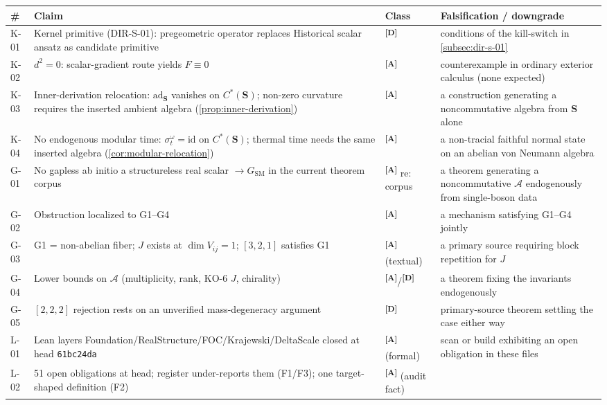 \documentclass[12pt,a4paper,twoside]{article}
\theoremstyle{plain}
\theoremstyle{definition}
\theoremstyle{remark}
\newcommand{\catmark}[1]{\textsuperscript{\textsf{\textbf{[#1]}}}}
\begin{document}
\begin{table}[htbp]
\centering\footnotesize
\begin{tabular}{@{}lp{5.3cm}lp{4.3cm}@{}}
\toprule
\# & Claim & Class & Falsification / downgrade \\
\midrule
K-01 & Kernel primitive (DIR-S-01): pregeometric operator replaces
Historical scalar ansatz as candidate primitive & \catmark{D} & conditions of the
kill-switch in \cref{subsec:dir-s-01} \\
K-02 & $d^2=0$: scalar-gradient route yields $F \equiv 0$ &
\catmark{A} & counterexample in ordinary exterior calculus (none
expected) \\
K-03 & Inner-derivation relocation: $\mathrm{ad}_{\mathbf S}$ vanishes on
$C^{\ast}(\mathbf S)$; non-zero curvature requires the inserted ambient
algebra (\cref{prop:inner-derivation}) & \catmark{A} & a construction
generating a noncommutative algebra from $\mathbf S$ alone \\
K-04 & No endogenous modular time: $\sigma^\omega_t=\mathrm{id}$ on
$C^{\ast}(\mathbf S)$; thermal time needs the same inserted algebra
(\cref{cor:modular-relocation}) & \catmark{A} & a non-tracial faithful normal
state on an abelian von Neumann algebra \\
G-01 & No gapless ab initio a structureless real scalar $\to G_{\mathrm{SM}}$ in the current
theorem corpus & \catmark{A} re: corpus & a theorem generating a
noncommutative $\mathcal A$ endogenously from single-boson data \\
G-02 & Obstruction localized to G1--G4 & \catmark{A} & a mechanism
satisfying G1--G4 jointly \\
G-03 & G1 = non-abelian fiber; $J$ exists at $\dim V_{ij}=1$;
$[3,2,1]$ satisfies G1 & \catmark{A} (textual) & a primary source
requiring block repetition for $J$ \\
G-04 & Lower bounds on $\mathcal A$ (multiplicity, rank, KO-6 $J$,
chirality) & \catmark{A}/\catmark{D} & a theorem fixing the invariants
endogenously \\
G-05 & $[2,2,2]$ rejection rests on an unverified mass-degeneracy
argument & \catmark{D} & primary-source theorem settling the case
either way \\
L-01 & Lean layers Foundation/RealStructure/FOC/Krajewski/DeltaScale
closed at head \texttt{61bc24da} & \catmark{A} (formal) & scan or build
exhibiting an open obligation in these files \\
L-02 & 51 open obligations at head; register under-reports them
(F1/F3); one target-shaped definition (F2) & \catmark{A} (audit fact) &

\end{tabular}
\end{table}
\end{document}

